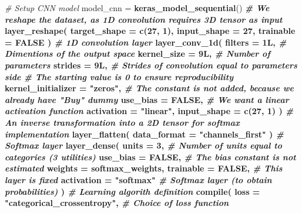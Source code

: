 \documentclass[11pt,]{article}
\newenvironment{Shaded}{\begin{snugshade}}{\end{snugshade}}
\newcommand{\CommentTok}[1]{\textcolor[rgb]{0.56,0.35,0.01}{\textit{#1}}}
\newcommand{\DataTypeTok}[1]{\textcolor[rgb]{0.13,0.29,0.53}{#1}}
\newcommand{\DecValTok}[1]{\textcolor[rgb]{0.00,0.00,0.81}{#1}}
\newcommand{\KeywordTok}[1]{\textcolor[rgb]{0.13,0.29,0.53}{\textbf{#1}}}
\newcommand{\NormalTok}[1]{#1}
\newcommand{\OperatorTok}[1]{\textcolor[rgb]{0.81,0.36,0.00}{\textbf{#1}}}
\newcommand{\OtherTok}[1]{\textcolor[rgb]{0.56,0.35,0.01}{#1}}
\newcommand{\StringTok}[1]{\textcolor[rgb]{0.31,0.60,0.02}{#1}}
\begin{document}
\begin{Shaded}
\begin{Highlighting}[]
\CommentTok{# Setup CNN model}
\NormalTok{model_cnn =}\StringTok{ }\KeywordTok{keras_model_sequential}\NormalTok{() }\OperatorTok{%>%}
\StringTok{    }\CommentTok{# We reshape the dataset, as 1D convolution requires 3D tensor as input}
\StringTok{    }\KeywordTok{layer_reshape}\NormalTok{(}
        \DataTypeTok{target_shape =} \KeywordTok{c}\NormalTok{(}\DecValTok{27}\NormalTok{, }\DecValTok{1}\NormalTok{),}
        \DataTypeTok{input_shape =} \DecValTok{27}\NormalTok{,}
        \DataTypeTok{trainable =} \OtherTok{FALSE}
\NormalTok{    ) }\OperatorTok{%>%}\StringTok{ }
\StringTok{    }\CommentTok{# 1D convolution layer}
\StringTok{    }\KeywordTok{layer_conv_1d}\NormalTok{(}
        \DataTypeTok{filters =}\NormalTok{ 1L, }\CommentTok{# Dimentions of the output space}
        \DataTypeTok{kernel_size =}\NormalTok{ 9L, }\CommentTok{# Number of parameters}
        \DataTypeTok{strides =}\NormalTok{ 9L, }\CommentTok{# Strides of convolution equal to parameters side}
        \CommentTok{# The starting value is 0 to ensure reproducibility}
        \DataTypeTok{kernel_initializer =} \StringTok{"zeros"}\NormalTok{, }
        \CommentTok{# The constant is not added, because we already have "Buy" dummy}
        \DataTypeTok{use_bias =} \OtherTok{FALSE}\NormalTok{, }
        \CommentTok{# We want a linear activation function }
        \DataTypeTok{activation =} \StringTok{"linear"}\NormalTok{, }
        \DataTypeTok{input_shape =} \KeywordTok{c}\NormalTok{(}\DecValTok{27}\NormalTok{, }\DecValTok{1}\NormalTok{)}
\NormalTok{    ) }\OperatorTok{%>%}\StringTok{ }
\StringTok{    }\CommentTok{# An inverse transformation into a 2D tensor for softmax implementation}
\StringTok{    }\KeywordTok{layer_flatten}\NormalTok{(}
        \DataTypeTok{data_format =} \StringTok{"channels_first"}
\NormalTok{    ) }\OperatorTok{%>%}
\StringTok{    }\CommentTok{# Softmax layer}
\StringTok{    }\KeywordTok{layer_dense}\NormalTok{(}
        \DataTypeTok{units =} \DecValTok{3}\NormalTok{, }\CommentTok{# Number of units equal to categories (3 utilities)}
        \DataTypeTok{use_bias =} \OtherTok{FALSE}\NormalTok{, }\CommentTok{# The bias constant is not estimated}
        \DataTypeTok{weights =}\NormalTok{ softmax_weights,}
        \DataTypeTok{trainable =} \OtherTok{FALSE}\NormalTok{, }\CommentTok{# This layer is fixed}
        \DataTypeTok{activation =} \StringTok{"softmax"} \CommentTok{# Softmax layer (to obtain probabilities)}
\NormalTok{    ) }\OperatorTok{%>%}\StringTok{ }
\StringTok{    }\CommentTok{# Learning algorith definition}
\StringTok{    }\KeywordTok{compile}\NormalTok{(}
        \DataTypeTok{loss =} \StringTok{"categorical_crossentropy"}\NormalTok{, }\CommentTok{# Choice of loss function}
}}}}}
\end{Highlighting}
\end{Shaded}
\end{document}
